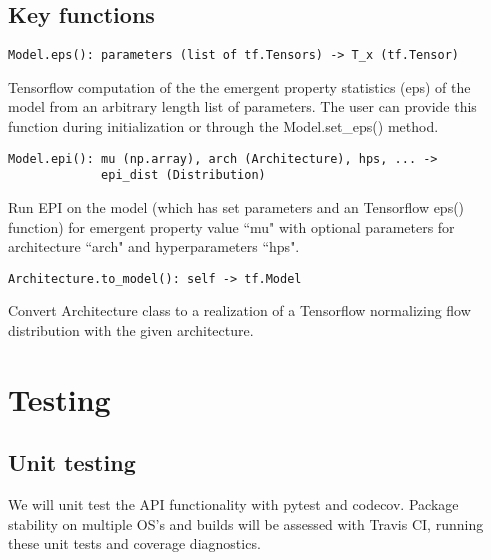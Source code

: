\documentclass[11pt]{article}
\begin{document}

\subsection{Key functions}
\begin{verbatim}
Model.eps(): parameters (list of tf.Tensors) -> T_x (tf.Tensor)
\end{verbatim}
Tensorflow computation of the the emergent property statistics (eps) of the model  from an arbitrary length list of parameters.  The user can provide this function during initialization or through the Model.set\_eps() method.

\begin{verbatim}
Model.epi(): mu (np.array), arch (Architecture), hps, ... -> 
             epi_dist (Distribution)
\end{verbatim}
Run EPI on the model (which has set parameters and an Tensorflow eps() function) for emergent property value ``mu" with optional parameters for architecture ``arch" and hyperparameters ``hps".

\begin{verbatim}
Architecture.to_model(): self -> tf.Model
\end{verbatim}
Convert Architecture class to a realization of a Tensorflow normalizing flow distribution with the given architecture.

\section{Testing}
\subsection{Unit testing}
We will unit test the API functionality with pytest and codecov.  Package stability on multiple OS's and builds will be assessed with Travis CI, running these unit tests and coverage diagnostics.
\end{document}
